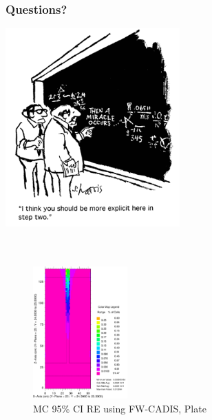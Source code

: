 \documentclass[xcolor=x11names,compress]{beamer}
\renewcommand{\(}{\begin{columns}}
\renewcommand{\)}{\end{columns}}
\newcommand{\<}[1]{\begin{column}{#1}}
\renewcommand{\>}{\end{column}}
\begin{document}
\section*{}
\begin{frame}[fragile]
  \frametitle{Questions?}
  \begin{center}
  \includegraphics[height=3in,clip]{../questions-comic}  
  \end{center}
  
\end{frame}

\section*{}
\begin{frame}[fragile]
	\begin{columns}
  	\begin{column}{0.5\textwidth}

  	\end{column}
 	\begin{column}{0.5\textwidth}


  	\end{column}
	\end{columns}
	
  	\begin{center}
  	\begin{figure}
  		\includegraphics[height=2in,clip]{plate-badVR}
  		\caption{MC 95\% CI RE using FW-CADIS, Plate}
  	\end{figure}
  	\end{center}
  
\end{frame}
\end{document}
